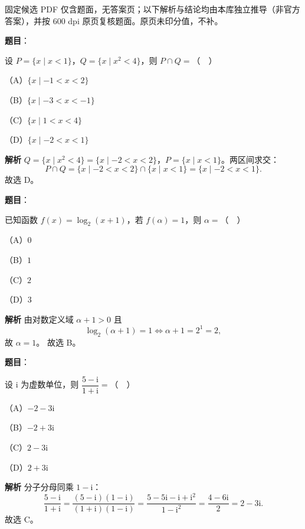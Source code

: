 \begin{gktip}
固定候选 PDF 仅含题面，无答案页；以下解析与结论均由本库独立推导（非官方答案），并按 600 dpi 原页复核题面。原页未印分值，不补。
\end{gktip}

\begin{answer}

\textbf{题目}：

设 $P=\{x\mid x<1\}$，$Q=\{x\mid x^2<4\}$，则 $P\cap Q=$（　）

（A）$\{x\mid -1<x<2\}$

（B）$\{x\mid -3<x<-1\}$

（C）$\{x\mid 1<x<4\}$

（D）$\{x\mid -2<x<1\}$

\textbf{解析}
$Q=\{x\mid x^2<4\}=\{x\mid -2<x<2\}$，$P=\{x\mid x<1\}$。两区间求交：
\nopagebreak[4]
\[P\cap Q=\{x\mid -2<x<2\}\cap\{x\mid x<1\}=\{x\mid -2<x<1\}.\]
故选 D。


\end{answer}
\begin{answer}

\textbf{题目}：

已知函数 $f(x)=\log_2(x+1)$，若 $f(\alpha)=1$，则 $\alpha=$（　）

（A）$0$

（B）$1$

（C）$2$

（D）$3$

\textbf{解析}
由对数定义域 $\alpha+1>0$ 且
\nopagebreak[4]
\[\log_2(\alpha+1)=1\iff\alpha+1=2^1=2,\]
故 $\alpha=1$。
故选 B。


\end{answer}
\begin{answer}

\textbf{题目}：

设 $\mathrm i$ 为虚数单位，则 $\dfrac{5-\mathrm i}{1+\mathrm i}=$（　）

（A）$-2-3\mathrm i$

（B）$-2+3\mathrm i$

（C）$2-3\mathrm i$

（D）$2+3\mathrm i$

\textbf{解析}
分子分母同乘 $1-\mathrm i$：
\nopagebreak[4]
\[\frac{5-\mathrm i}{1+\mathrm i}
=\frac{(5-\mathrm i)(1-\mathrm i)}{(1+\mathrm i)(1-\mathrm i)}
=\frac{5-5\mathrm i-\mathrm i+\mathrm i^2}{1-\mathrm i^2}
=\frac{4-6\mathrm i}{2}=2-3\mathrm i.\]
故选 C。


\end{answer}
